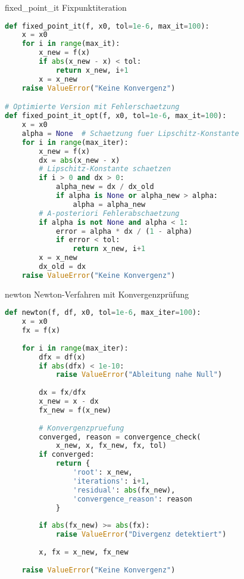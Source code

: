 \begin{examplecode}{fixed\_point\_it} Fixpunktiteration
\begin{lstlisting}[language=Python, style=basesmol]
def fixed_point_it(f, x0, tol=1e-6, max_it=100):
    x = x0
    for i in range(max_it):
        x_new = f(x)
        if abs(x_new - x) < tol:
            return x_new, i+1
        x = x_new
    raise ValueError("Keine Konvergenz")

# Optimierte Version mit Fehlerschaetzung
def fixed_point_it_opt(f, x0, tol=1e-6, max_it=100):
    x = x0
    alpha = None  # Schaetzung fuer Lipschitz-Konstante
    for i in range(max_iter):
        x_new = f(x)
        dx = abs(x_new - x)
        # Lipschitz-Konstante schaetzen
        if i > 0 and dx > 0:
            alpha_new = dx / dx_old
            if alpha is None or alpha_new > alpha:
                alpha = alpha_new
        # A-posteriori Fehlerabschaetzung
        if alpha is not None and alpha < 1:
            error = alpha * dx / (1 - alpha)
            if error < tol:
                return x_new, i+1
        x = x_new
        dx_old = dx
    raise ValueError("Keine Konvergenz")
\end{lstlisting}
\end{examplecode}

\begin{examplecode}{newton} Newton-Verfahren mit Konvergenzprüfung
\begin{lstlisting}[language=Python, style=basesmol]
def newton(f, df, x0, tol=1e-6, max_iter=100):
    x = x0
    fx = f(x)
    
    for i in range(max_iter):
        dfx = df(x)
        if abs(dfx) < 1e-10:
            raise ValueError("Ableitung nahe Null")
            
        dx = fx/dfx
        x_new = x - dx
        fx_new = f(x_new)
        
        # Konvergenzpruefung
        converged, reason = convergence_check(
            x_new, x, fx_new, fx, tol)
        if converged:
            return {
                'root': x_new,
                'iterations': i+1,
                'residual': abs(fx_new),
                'convergence_reason': reason
            }
            
        if abs(fx_new) >= abs(fx):
            raise ValueError("Divergenz detektiert")
            
        x, fx = x_new, fx_new
        
    raise ValueError("Keine Konvergenz")
\end{lstlisting}
\end{examplecode}

